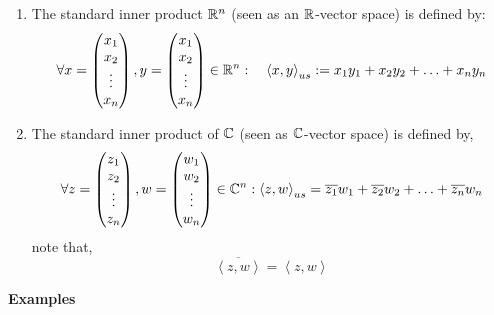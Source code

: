 \documentclass{report}
\begin{document}
\begin{enumerate}
\item The standard inner product $\mathbb{R} ^n  $  (seen as an 
	$\mathbb{R}$-vector space) is defined by:
	\[
	\forall  x= 
	\begin{pmatrix}
		x_1 \\
		x_2 \\
		\vdots  \\
		x_{n} \\
	\end{pmatrix} , y=
	\begin{pmatrix}
		x_1 \\
		x_2 \\
		\vdots  \\
		x_{n} \\
	\end{pmatrix} 
	\in  \mathbb{R} ^n 
	: \quad \left\langle x,y \right\rangle _{us} := 
	x_1 y_1 + x_2 y_2 +  \hdots + x_n y_n 
	\]
\item The standard inner product of $\mathbb{C}  $ (seen as $\mathbb{C}  $-vector space)  
	is defined by, 
	\[
	\forall  z= 
	\begin{pmatrix}
		z_1 \\
		z_2 \\
		\vdots  \\
		z_{n} \\
	\end{pmatrix} , w=
	\begin{pmatrix}
		w_1 \\
		w_2 \\
		\vdots  \\
		w_{n} \\
	\end{pmatrix} 
	\in  \mathbb{C}  ^n  : 
	\left\langle 
		z,w 
	\right\rangle _{us} = 
	\overline{z_1}w_1 + 
	\overline{z_2}w_2 + \hdots +
	\overline{z_n }w_n 
	\]  
	note that, 
	\[
		\overline{\left\langle z,w \right\rangle } =
		\left\langle z,w \right\rangle 
	\] 
\end{enumerate}
\begin{center}
	\textbf{Examples} \it 
\end{center}
\end{document}
